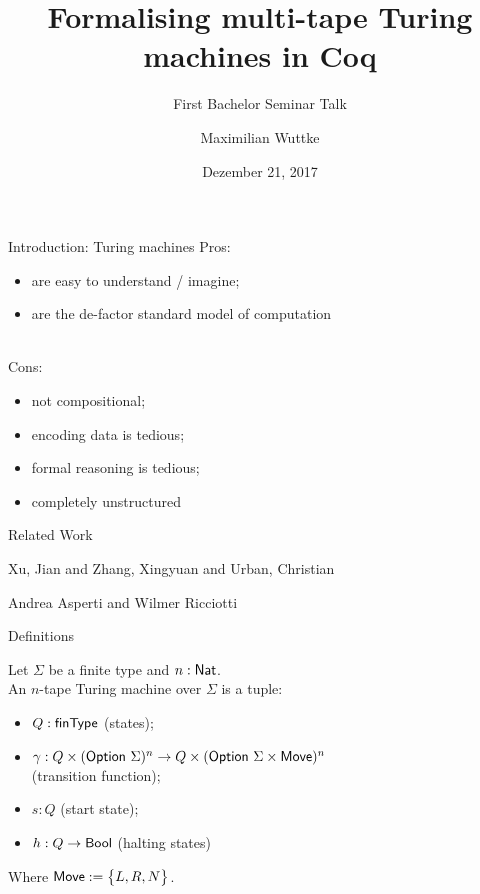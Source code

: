 

\usepackage{verbatim}

\title{Formalising multi-tape Turing machines in Coq}
\subtitle{First Bachelor Seminar Talk}
\author{Maximilian Wuttke}
\date{Dezember 21, 2017}

% 



\frame{\titlepage}

\begin{frame}{Introduction: Turing machines}
  Pros:
  \begin{itemize}
    \item are easy to understand / imagine;
    \item are the de-factor standard model of computation
  \end{itemize}
  \pause \\
  Cons:
  \begin{itemize}
    \item not compositional;
    \item encoding data is tedious;
    \item formal reasoning is tedious;
    \item completely unstructured
  \end{itemize}
\end{frame}

\begin{frame}{Related Work}
  \footnotesize
  \begin{thebibliography}{10}
    \beamertemplatearticlebibitems
    \bibitem{}
    Xu, Jian and Zhang, Xingyuan and Urban, Christian

    \bibitem{}
    Andrea Asperti and Wilmer Ricciotti

  \end{thebibliography}
\end{frame}


\begin{frame}{Definitions}
  \begin{definition}
    Let $\Sigma$ be a finite type and $n:\textsf{Nat}$.
    \\
    An $n$-tape Turing machine over $\Sigma$ is a tuple:
    \begin{itemize}
      \item $Q : \textsf{finType}$ (states);
      \item $\gamma : Q \times (\textsf{Option}~\Sigma)^n \rightarrow Q \times (\textsf{Option}~\Sigma \times \textsf{Move})^n$
        \\ (transition function);
      \item $s:Q$ (start state);
      \item $h : Q \rightarrow \textsf{Bool}$ (halting states)
    \end{itemize}
    Where $\textsf{Move} := \bigl\{ L, R, N \bigr \}$.
  \end{definition}
\end{frame}

